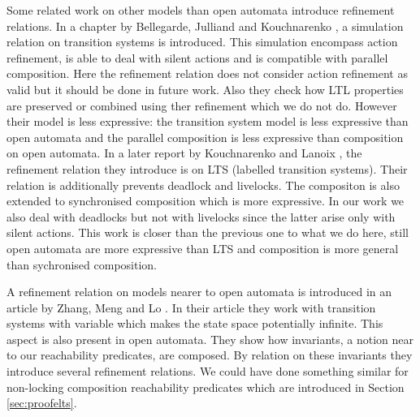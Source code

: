 \documentclass{article}
\begin{document}
Some related work on other models than open automata introduce refinement relations.
In a chapter by Bellegarde, Julliand and Kouchnarenko \cite{10.1007/3-540-46428-X_19}, a simulation relation on transition systems is introduced.
This simulation encompass action refinement, is able to deal with silent actions and is compatible with parallel composition.
Here the refinement relation does not consider action refinement as valid but it should be done in future work.
Also they check how LTL properties are preserved or combined using ther refinement which we do not do.
However their model is less expressive: the transition system model is less expressive than open automata and the parallel composition is less expressive than composition on open automata.
In a later report by Kouchnarenko and Lanoix \cite{10.1007/978-3-540-70881-0_26}, the refinement relation they introduce is on LTS (labelled transition systems).
Their relation is additionally prevents deadlock and livelocks.
The compositon is also extended to synchronised composition which is more expressive.
In our work we also deal with deadlocks but not with livelocks since the latter arise only with silent actions.
This work is closer than the previous one to what we do here, still open automata are more expressive than LTS and composition is more general than sychronised composition.

A refinement relation on models nearer to open automata is introduced in an article by Zhang, Meng and Lo \cite{Zhang2014}.
In their article they work with transition systems with variable which makes the state space potentially infinite.
This aspect is also present in open automata.
They show how invariants, a notion near to our reachability predicates, are composed.
By relation on these invariants they introduce several refinement relations.
We could have done something similar for non-locking composition reachability predicates which are introduced in Section \ref{sec:proofelts}.
\end{document}
